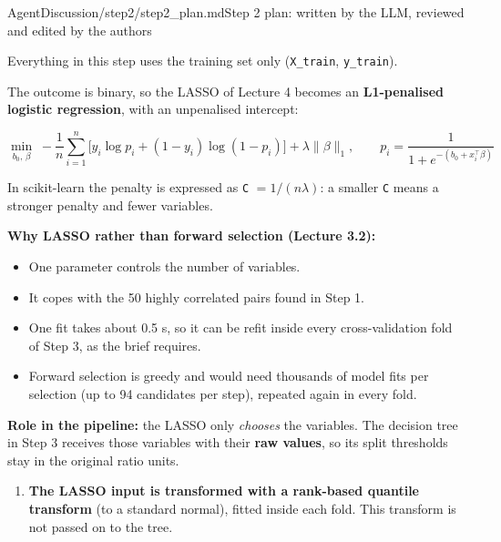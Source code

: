 \begin{mdfile}{AgentDiscussion/\allowbreak{}step2/\allowbreak{}step2\_plan.md}{Step 2 plan: written by the LLM, reviewed and edited by the authors}

Everything in this step uses the training set only (\texttt{X\_train}, \texttt{y\_train}).


The outcome is binary, so the LASSO of Lecture 4 becomes an \textbf{L1-penalised logistic regression}, with an unpenalised intercept:

\[\min_{b_0,\,\beta}\; -\frac{1}{n}\sum_{i=1}^{n}\Big[y_i \log p_i + (1-y_i)\log(1-p_i)\Big] + \lambda \lVert\beta\rVert_1, \qquad p_i = \frac{1}{1+e^{-(b_0 + x_i^\top\beta)}}\]

In scikit-learn the penalty is expressed as \texttt{C} \(= 1/(n\lambda)\): a smaller \texttt{C} means a stronger penalty and fewer variables.

\textbf{Why LASSO rather than forward selection (Lecture 3.2):}

\begin{itemize}
\tightlist
\item
  One parameter controls the number of variables.
\item
  It copes with the 50 highly correlated pairs found in Step 1.
\item
  One fit takes about 0.5 s, so it can be refit inside every cross-validation fold of Step 3, as the brief requires.
\item
  Forward selection is greedy and would need thousands of model fits per selection (up to 94 candidates per step), repeated again in every fold.
\end{itemize}

\textbf{Role in the pipeline:} the LASSO only \emph{chooses} the variables. The decision tree in Step 3 receives those variables with their \textbf{raw values}, so its split thresholds stay in the original ratio units.


\begin{enumerate}
\def\labelenumi{\arabic{enumi}.}
\item
  \textbf{The LASSO input is transformed with a rank-based quantile transform} (to a standard normal), fitted inside each fold. This transform is not passed on to the tree.


\end{enumerate}
\end{mdfile}
